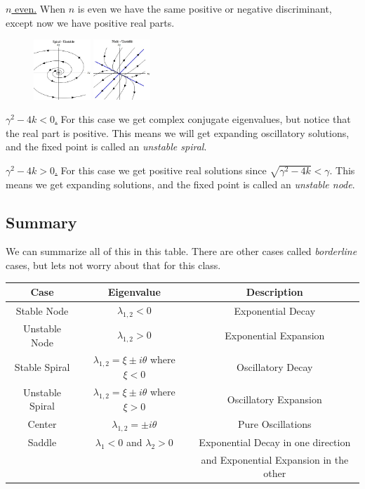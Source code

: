\documentclass[reqno]{amsart}
\theoremstyle{definition}
\begin{document}
\underline{\Large $n$ even.}  When $n$ is even we have the same positive
or negative discriminant, except now we have positive real parts.

\begin{figure}
\centering
\includegraphics[width = 0.19\textwidth]{UnstableSpiral}
\includegraphics[width = 0.19\textwidth]{UnstableNode}
\end{figure}

\underline{\large $\gamma^2 - 4k < 0$.}  For this case we get complex conjugate
eigenvalues, but notice that the real part is positive.  This means we will get
expanding oscillatory solutions, and the fixed point is called an \emph{unstable spiral}.

\underline{\large $\gamma^2 - 4k > 0$.}  For this case we get positive real solutions
since $\sqrt{\gamma^2 - 4k} < \gamma$.  This means we get expanding solutions,
and the fixed point is called an \emph{unstable node}.

\subsection*{Summary}

We can summarize all of this in this table.  There are other cases called \emph{borderline}
cases, but lets not worry about that for this class.

\begin{table}[htbp]
\centering
\begin{tabular}{c||c|c|}
Case & Eigenvalue & Description\\
\hline
Stable Node & $\lambda_{1,2} < 0$ & Exponential Decay\\
\hline
Unstable Node & $\lambda_{1,2} > 0$ & Exponential Expansion\\
\hline
Stable Spiral & $\lambda_{1,2} = \xi \pm i\theta$ where $\xi < 0$ & Oscillatory Decay\\
\hline
Unstable Spiral & $\lambda_{1,2} = \xi \pm i\theta$ where $\xi > 0$ & Oscillatory Expansion\\
\hline
Center & $\lambda_{1,2} = \pm i\theta$ & Pure Oscillations\\
\hline
Saddle & $\lambda_1 < 0$ and $\lambda_2 > 0$ & Exponential Decay in one direction\\
& & and Exponential Expansion in the other\\
\hline
\end{tabular}
\end{table}
\end{document}
